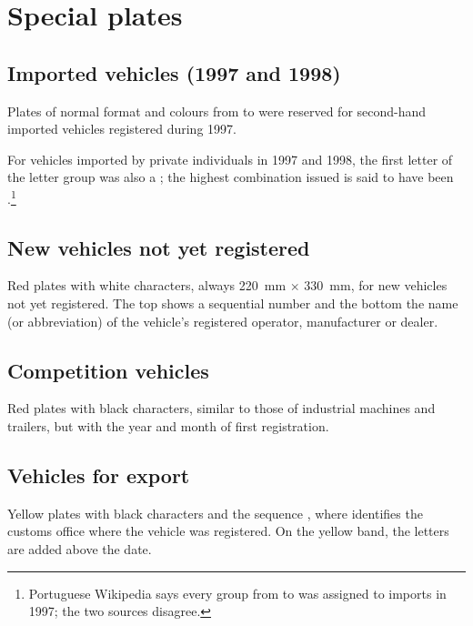 \section{Special plates}

\subsection{Imported vehicles (1997 and 1998)}\label{sec:importados}

Plates of normal format and colours from  to  were
reserved for second-hand imported vehicles registered during 1997.

For vehicles imported by private individuals in 1997 and 1998, the first letter
of the letter group was also a ; the highest combination issued is said
to have been .\footnote{Portuguese Wikipedia says every group from  to
 was assigned to imports in 1997; the two sources disagree.}


\subsection{New vehicles not yet registered}

Red plates with white characters, always 220~mm $\times$ 330~mm, for new vehicles
not yet registered. The top shows a sequential number and the bottom the name (or
abbreviation) of the vehicle's registered operator, manufacturer or dealer.


\subsection{Competition vehicles}

Red plates with black characters, similar to those of industrial machines and
trailers, but with the year and month of first registration.


\subsection{Vehicles for export}

Yellow plates with black characters and the sequence , where
 identifies the customs office where the vehicle was registered. On the
yellow band, the letters  are added above the date.

